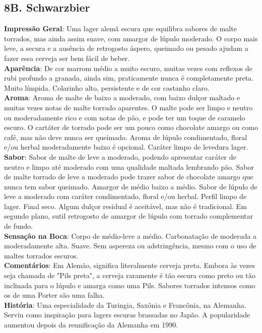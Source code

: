 \subsection*{8B. Schwarzbier}
\textbf{Impressão Geral}: Uma lager alemã escura que equilibra sabores de malte torrados, mas ainda assim suave, com amargor de lúpulo moderado. O corpo mais leve, a secura e a ausência de retrogosto áspero, queimado ou pesado ajudam a fazer essa cerveja ser bem fácil de beber. \\
\textbf{Aparência}: De cor marrom médio a muito escuro, muitas vezes com reflexos de rubi profundo a granada, ainda sim, praticamente nunca é completamente preta. Muito límpida. Colarinho alto, persistente e de cor castanho claro. \\
\textbf{Aroma}: Aroma de malte de baixo a moderado, com baixo dulçor maltado e muitas vezes notas de malte torrado aparentes. O malte pode ser limpo e neutro ou moderadamente rico e com notas de pão, e pode ter um toque de caramelo escuro. O cartáter de torrado pode ser um pouco como chocolate amargo ou como café, mas não deve nunca ser queimado. Aroma de lúpulo condimentado, floral e/ou herbal moderadamente baixo é opcional. Caráter limpo de levedura lager. \\
\textbf{Sabor}: Sabor de malte de leve a moderado, podendo apresentar caráter de neutro e limpo até moderado com uma qualidade maltada lembrando pão. Sabor de malte torrado de leve a moderado pode trazer sabor de chocolate amargo que nunca tem sabor queimado. Amargor de médio baixo a médio. Sabor de lúpulo de leve a moderado com caráter condimentado, floral e/ou herbal. Perfil limpo de lager. Final seco. Algum dulçor residual é aceitável, mas não é tradicional. Em segundo plano, sutil retrogosto de amargor de lúpulo com torrado complementar de fundo. \\
\textbf{Sensação na Boca}: Corpo de médio-leve a médio. Carbonatação de moderada a moderadamente alta. Suave. Sem aspereza ou adstringência, mesmo com o uso de maltes torrados escuros. \\
\textbf{Comentários}: Em Alemão, significa literalmente cerveja preta. Embora às vezes seja chamada de "Pils preta", a cerveja raramente é tão escura como preto ou tão inclinada para o lúpulo e amarga como uma Pils. Sabores torrados intensos como os de uma Porter são uma falha. \\
\textbf{História}: Uma especialidade da Turingia, Saxônia e Francônia, na Alemanha. Serviu como inspiração para lagers escuras brassadas no Japão. A popularidade aumentou depois da reunificação da Alemanha em 1990. \\
